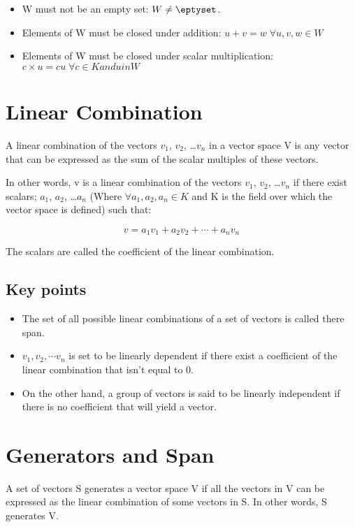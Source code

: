 \documentclass{book}
\begin{document}
\begin{itemize}
	\item W must not be an empty set: \(W \neq \eptyset\).
	\item Elements of W must be closed under addition: \(u + v = w \; \forall u, v, w \in W\)
	\item Elements of W must be closed under scalar multiplication: \(c \times u = cu \; \forall c \in K and u in W\)
\end{itemize}

\section{Linear Combination}
A linear combination of the vectors \(v_1\), \(v_2\), \ldots \(v_n\) in a vector space V is any vector that can be expressed as the sum of the scalar multiples of these vectors.

In other words, v is a linear combination of the vectors \(v_1\), \(v_2\), \ldots \(v_n\) if there exist scalars; \(a_1\), \(a_2\), \ldots \(a_n\) (Where \(\forall a_1, a_2, a_n \in K\) and K is the field over which the vector space is defined) such that:

\[v = a_1 v_1 + a_2 v_2 + \cdots + a_n v_n\]

The scalars are called the coefficient of the linear combination.

\subsection{Key points}
\begin{itemize}
	\item The set of all possible linear combinations of a set of vectors is called there span.
	\item \(v_1, v_2, \cdots v_n\) is set to be linearly dependent if there exist a coefficient of the linear combination that isn't equal to 0.
	\item On the other hand, a group of vectors is said to be linearly independent if there is no coefficient that will yield a vector.
\end{itemize}

\section{Generators and Span}
A set of vectors S generates a vector space V if all the vectors in V can be expressed as the linear combination of some vectors in S. In other words, S generates V.
\end{document}
